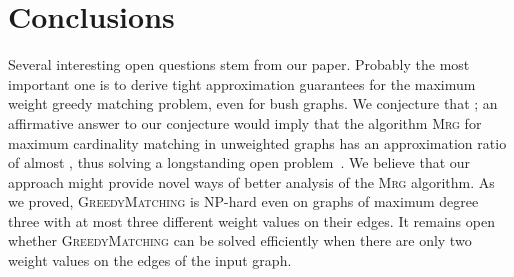 \documentclass[a4paper,11pt]{article}
\newcommand{\greedy}{\textsc{GreedyMatching}\xspace}
\newcommand{\rgma}{\textsc{Rgma}\xspace}
\newcommand{\mrg}{\textsc{Mrg}\xspace}
\begin{document}
\begin{comment}
\paragraph{\bf .}
Let  be the weight values of the bush graph. We can 
write the bush graph as  where  is the center of the bush of weight 
 and and  is a bush graph with  different weight values. Furthermore,
let  be the set of vertices that are the leaves 
of the bush . Clearly, every greedy matching will have an edge  
where . 

The expected weight  of the greedy matching produced by \rgma on the
bush graph  is

Furthermore, it holds that , thus . Combining that with the Equation~\ref{eq:avg} we get that

\end{comment}



\section{Conclusions}

Several interesting open questions stem from our paper. 
Probably the most important one is to derive tight approximation guarantees 
 for the maximum weight greedy matching problem, even for bush graphs. 
We conjecture that ; an affirmative answer to our conjecture 
would imply that the algorithm \mrg for maximum cardinality matching in 
unweighted graphs has an approximation ratio of almost , thus 
solving a longstanding open problem~\cite{PS12,ADFS95,DF91}. We believe that our
approach might provide novel ways of better analysis of the \mrg algorithm.
As we proved, \greedy is NP-hard even on graphs of maximum degree three with at 
most three different weight values on their edges. It remains open whether \greedy can be solved 
efficiently when there are only two weight values on the edges of the input graph.
\end{document}
